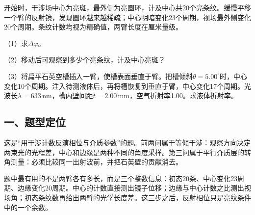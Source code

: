 \documentclass[12pt,a4paper,fontset=fandol]{ctexart}
\begin{document}
开始时，干涉场中心为亮斑，最外侧为亮圆环，计及中心共20个亮条纹。缓慢平移一个臂的反射镜，发现圆环越来越稀疏；中心明暗变化23个周期，视场最外侧变化20个周期。条纹计数均视为精确值，两臂长度在厘米量级。

（1）求\(\Delta\varphi\)。

（2）移动后可观察到多少个亮条纹，计及中心亮斑？

（3）将扁平石英空槽插入一臂，使槽表面垂直于臂。把槽倾斜\(\theta=5.00^\circ\)时，中心变化10个周期。注入待测液体后，再将槽恢复到垂直于臂，中心变化17个周期。光波长\(\lambda=633\,\mathrm{nm}\)，槽内壁间距\(t=2.00\,\mathrm{mm}\)，空气折射率1.00。求液体折射率。

\begin{center}
\begin{minipage}{\linewidth}
\centering\begingroup{}
\ifdim\wd\diagrambox>.88\linewidth
\sbox{\diagrambox}{\resizebox{.88\linewidth}{!}{\usebox{\diagrambox}}}\fi
\ifdim\ht\diagrambox>.38\textheight
\resizebox{!}{.38\textheight}{\usebox{\diagrambox}}
\else\usebox{\diagrambox}\fi
\par{}\endgroup\end{minipage}\end{center}

\subsection{一、题型定位}\label{ux4e00ux9898ux578bux5b9aux4f4d}

这是``用干涉计数反演相位与介质参数''的题。前两问属于等倾干涉：观察方向决定两束光的光程差，中心和边缘是两种不同的角度采样。第三问属于平行介质层的转角测量：必须比较同一出射波前，并把石英壁的贡献消去。

题中最有用的不是两臂各有多长，而是三个整数信息：初态20条、中心变化23周期、边缘变化20周期。中心的计数直接测出镜子位移；边缘与中心计数之比测出视场角；初态条纹数再给出两臂的光学长度差。这三步之后，反射相位只是亮纹条件中的一个余数。
\end{document}
